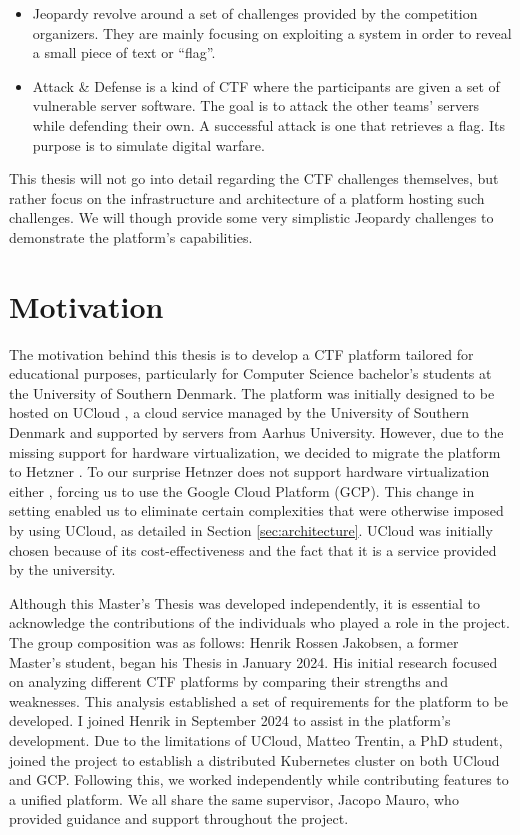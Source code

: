 \begin{itemize}
    \item Jeopardy revolve around a set of challenges provided by the competition organizers. They are mainly focusing on exploiting a system in order to reveal a small piece of text or ``flag''. 
    \item Attack \& Defense is a kind of CTF where the participants are given a set of vulnerable server software. The goal is to attack the other teams' servers while defending their own. A successful attack is one that retrieves a flag. Its purpose is to simulate digital warfare.
\end{itemize}

This thesis will not go into detail regarding the CTF challenges themselves, but rather focus on the infrastructure and architecture of a platform hosting such challenges. We will though provide some very simplistic Jeopardy challenges to demonstrate the platform's capabilities.

\section{Motivation}
The motivation behind this thesis is to develop a CTF platform tailored for educational purposes, particularly for Computer Science bachelor's students at the University of Southern Denmark. The platform was initially designed to be hosted on UCloud \Parencite{SDUCloud}, a cloud service managed by the University of Southern Denmark and supported by servers from Aarhus University. However, due to the missing support for hardware virtualization, we decided to migrate the platform to Hetzner \Parencite{Hetzner}. To our surprise Hetnzer does not support hardware virtualization either \Parencite{hetzner_nested_virtualization}, forcing us to use the Google Cloud Platform (GCP). This change in setting enabled us to eliminate certain complexities that were otherwise imposed by using UCloud, as detailed in Section \ref{sec:architecture}. UCloud was initially chosen because of its cost-effectiveness and the fact that it is a service provided by the university.

Although this Master's Thesis was developed independently, it is essential to acknowledge the contributions of the individuals who played a role in the project. The group composition was as follows: Henrik Rossen Jakobsen, a former Master's student, began his Thesis in January 2024. His initial research focused on analyzing different CTF platforms by comparing their strengths and weaknesses. This analysis established a set of requirements for the platform to be developed. I joined Henrik in September 2024 to assist in the platform's development. Due to the limitations of UCloud, Matteo Trentin, a PhD student, joined the project to establish a distributed Kubernetes cluster on both UCloud and GCP. Following this, we worked independently while contributing features to a unified platform. We all share the same supervisor, Jacopo Mauro, who provided guidance and support throughout the project.

